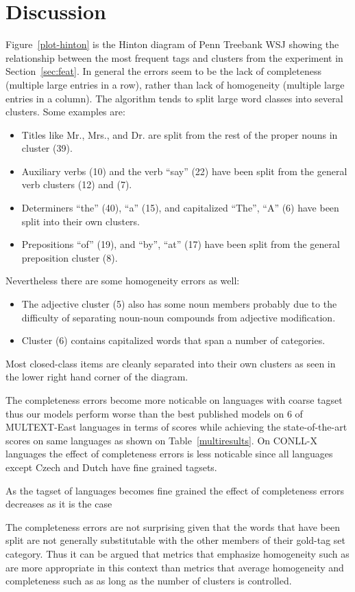 \section{Discussion}
\label{sec:discuss}

Figure~\ref{plot-hinton} is the Hinton diagram of Penn Treebank WSJ
showing the relationship between the most frequent tags and clusters
from the experiment in Section~\ref{sec:feat}.  In general the errors
seem to be the lack of completeness (multiple large entries in a row),
rather than lack of homogeneity (multiple large entries in a column).
The algorithm tends to split large word classes into several clusters.
Some examples are:
\begin{itemize}
\item Titles like Mr., Mrs., and Dr. are split from the rest of the
  proper nouns in cluster (39).
\item Auxiliary verbs (10) and the verb ``say'' (22) have been split
  from the general verb clusters (12) and (7).
\item Determiners ``the'' (40), ``a'' (15), and capitalized
  ``The'', ``A'' (6) have been split into their own clusters.
\item Prepositions ``of'' (19), and ``by'', ``at'' (17) have been
  split from the general preposition cluster (8).
\end{itemize}
Nevertheless there are some homogeneity errors as well:
\begin{itemize} 
\item The adjective cluster (5) also has some noun members probably
  due to the difficulty of separating noun-noun compounds from
  adjective modification.
\item Cluster (6) contains capitalized words that span a number of
  categories.
\end{itemize}
Most closed-class items are cleanly separated into their own clusters
as seen in the lower right hand corner of the diagram. 

The completeness errors become more noticable on languages with coarse
tagset thus our models perform worse than the best published models on
6 of MULTEXT-East languages in terms of \vm scores while achieving the
state-of-the-art \mto scores on same languages as shown on
Table~\ref{multiresults}.  On CONLL-X languages the effect of
completeness errors is less noticable since all languages except Czech
and Dutch have fine grained tagsets.

As the tagset of languages becomes fine grained the effect of
completeness errors decreases as it is the case

The completeness errors are not surprising given that the words that
have been split are not generally substitutable with the other members
of their gold-tag set category.  Thus it can be argued that metrics
that emphasize homogeneity such as \mto are more appropriate in this
context than metrics that average homogeneity and completeness such as
\vm as long as the number of clusters is controlled.

